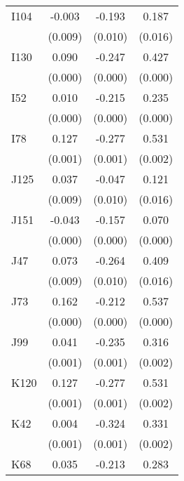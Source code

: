 \begin{table}[htbp]
\begin{tabular}{l*{3}{c}}
I104            &   -0.003         &   -0.193\sym{***}&    0.187\sym{***}\\
                &  (0.009)         &  (0.010)         &  (0.016)         \\
I130            &    0.090\sym{***}&   -0.247\sym{***}&    0.427\sym{***}\\
                &  (0.000)         &  (0.000)         &  (0.000)         \\
I52             &    0.010\sym{***}&   -0.215\sym{***}&    0.235\sym{***}\\
                &  (0.000)         &  (0.000)         &  (0.000)         \\
I78             &    0.127\sym{***}&   -0.277\sym{***}&    0.531\sym{***}\\
                &  (0.001)         &  (0.001)         &  (0.002)         \\
J125            &    0.037\sym{***}&   -0.047\sym{***}&    0.121\sym{***}\\
                &  (0.009)         &  (0.010)         &  (0.016)         \\
J151            &   -0.043\sym{***}&   -0.157\sym{***}&    0.070\sym{***}\\
                &  (0.000)         &  (0.000)         &  (0.000)         \\
J47             &    0.073\sym{***}&   -0.264\sym{***}&    0.409\sym{***}\\
                &  (0.009)         &  (0.010)         &  (0.016)         \\
J73             &    0.162\sym{***}&   -0.212\sym{***}&    0.537\sym{***}\\
                &  (0.000)         &  (0.000)         &  (0.000)         \\
J99             &    0.041\sym{***}&   -0.235\sym{***}&    0.316\sym{***}\\
                &  (0.001)         &  (0.001)         &  (0.002)         \\
K120            &    0.127\sym{***}&   -0.277\sym{***}&    0.531\sym{***}\\
                &  (0.001)         &  (0.001)         &  (0.002)         \\
K42             &    0.004\sym{***}&   -0.324\sym{***}&    0.331\sym{***}\\
                &  (0.001)         &  (0.001)         &  (0.002)         \\
K68             &    0.035\sym{***}&   -0.213\sym{***}&    0.283\sym{***}\\

\end{tabular}
\end{table}
